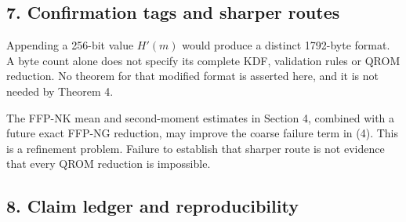 \documentclass[11pt,a4paper]{article}
\begin{document}
\subsection{7. Confirmation tags and sharper routes}\label{confirmation-tags-and-sharper-routes}

Appending a 256-bit value \(H'(m)\) would produce a distinct 1792-byte format. A byte count alone does not specify its complete KDF, validation rules or QROM reduction. No theorem for that modified format is asserted here, and it is not needed by Theorem 4.

The FFP-NK mean and second-moment estimates in Section 4, combined with a future exact FFP-NG reduction, may improve the coarse failure term in (4). This is a refinement problem. Failure to establish that sharper route is not evidence that every QROM reduction is impossible.

\subsection{8. Claim ledger and reproducibility}\label{claim-ledger-and-reproducibility}
\end{document}
